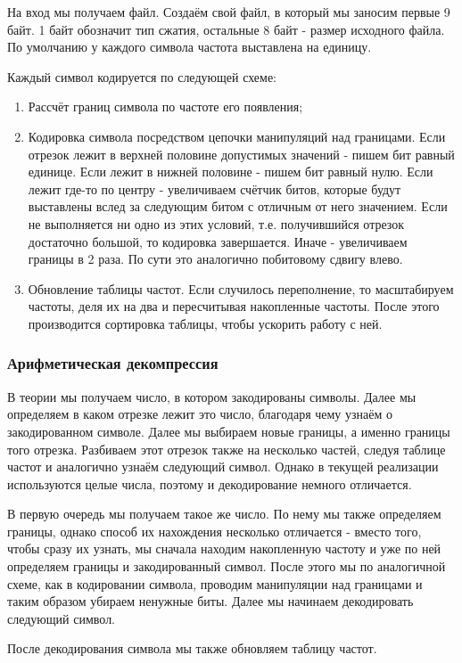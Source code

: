 \documentclass[12pt]{article}
\begin{document}
	На вход мы получаем файл. Создаём свой файл, в который мы заносим первые 9 байт. 1 байт обозначит тип сжатия, остальные 8 байт - размер исходного файла. По умолчанию у каждого символа частота выставлена на единицу.
	
	Каждый символ кодируется по следующей схеме:
	
	\begin{enumerate}
		\item Рассчёт границ символа по частоте его появления;
		\item Кодировка символа посредством цепочки манипуляций над границами. Если отрезок лежит в верхней половине допустимых значений - пишем бит равный единице. Если лежит в нижней половине - пишем бит равный нулю. Если лежит где-то по центру - увеличиваем счётчик битов, которые будут выставлены вслед за следующим битом с отличным от него значением. Если не выполняется ни одно из этих условий, т.е. получившийся отрезок достаточно большой, то кодировка завершается. Иначе - увеличиваем границы в 2 раза. По сути это аналогично побитовому сдвигу влево.
		\item Обновление таблицы частот. Если случилось переполнение, то масштабируем частоты, деля их на два и пересчитывая накопленные частоты. После этого производится сортировка таблицы, чтобы ускорить работу с ней.
	\end{enumerate}
	\subsubsection*{Арифметическая декомпрессия}
	В теории мы получаем число, в котором закодированы символы. Далее мы определяем в каком отрезке лежит это число, благодаря чему узнаём о закодированном символе. Далее мы выбираем новые границы, а именно границы того отрезка. Разбиваем этот отрезок также на несколько частей, следуя таблице частот и аналогично узнаём следующий символ. Однако в текущей реализации используются целые числа, поэтому и декодирование немного отличается.
	
	В первую очередь мы получаем такое же число. По нему мы также определяем границы, однако способ их нахождения несколько отличается - вместо того, чтобы сразу их узнать, мы сначала находим накопленную частоту и уже по ней определяем границы и закодированный символ. После этого мы по аналогичной схеме, как в кодировании символа, проводим манипуляции над границами и таким образом убираем ненужные биты. Далее мы начинаем декодировать следующий символ.
	
	После декодирования символа мы также обновляем таблицу частот.
	
\end{document}
